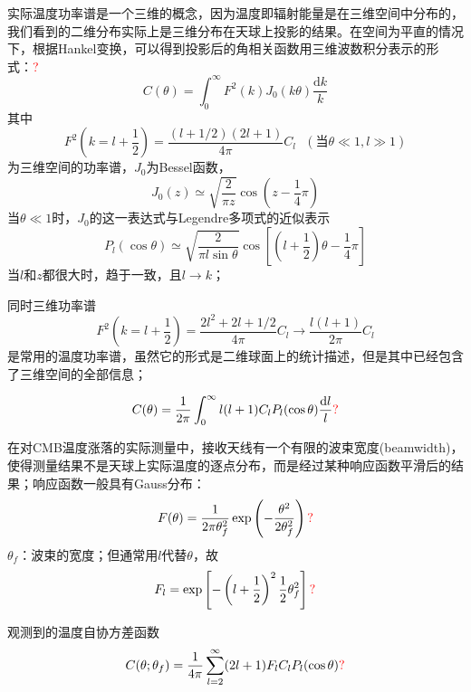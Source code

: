 \documentclass[12pt,a4paper]{article}
\newcommand{\dif}{\mathrm{d}}
\begin{document}
实际温度功率谱是一个三维的概念，因为温度即辐射能量是在三维空间中分布的，我们看到的二维分布实际上是三维分布在天球上投影的结果。在空间为平直的情况下，根据Hankel变换，可以得到投影后的角相关函数用三维波数积分表示的形式：\textcolor{red}{?}
\begin{equation}
C(\theta) = \int_0^{\infty} F^2(k) J_0(k\theta) \frac{\dif k}{k}
\end{equation}
其中
\begin{equation}
F^2(k = l+\frac{1}{2}) = \frac{(l+1/2)(2l+1)}{4\pi} C_l ~~~(\text{当}\theta \ll 1, l \gg 1)
\end{equation}
为三维空间的功率谱，$J_0$为Bessel函数，
\begin{equation}
J_0(z) \simeq \sqrt{\frac{2}{\pi z}} \cos(z-\frac{1}{4} \pi)
\end{equation}
当$\theta \ll 1$时，$J_0$的这一表达式与Legendre多项式的近似表示
\begin{equation}
P_l (\cos \theta) \simeq \sqrt{\frac{2}{\pi l \sin \theta}} \cos \left[(l+\frac{1}{2})\theta -\frac{1}{4} \pi \right]
\end{equation}
当$l$和$z$都很大时，趋于一致，且$l\rightarrow k$；

同时三维功率谱
\begin{equation}
F^2(k = l+\frac{1}{2}) = \frac{2l^2 +2l +1/2}{4\pi} C_l \rightarrow \frac{l(l+1)}{2\pi} C_l
\end{equation}
是常用的温度功率谱，虽然它的形式是二维球面上的统计描述，但是其中已经包含了三维空间的全部信息；

\begin{equation}
C(\theta) = \frac{1}{2\pi} \int_0^{\infty} l(l+1) C_l P_l (\cos \theta) \frac{\dif l}{l}\textcolor{red}{?}
\end{equation}

在对CMB温度涨落的实际测量中，接收天线有一个有限的波束宽度(beamwidth)，使得测量结果不是天球上实际温度的逐点分布，而是经过某种响应函数平滑后的结果；响应函数一般具有Gauss分布：
\begin{equation}
F(\theta) = \frac{1}{2\pi \theta_f^2} \exp \left(-\frac{\theta^2}{2\theta_f^2} \right)\textcolor{red}{?}
\end{equation}
$\theta_f$：波束的宽度；但通常用$l$代替$\theta$，故
\begin{equation}
F_l = \exp \left[ -\left(l+\frac{1}{2} \right)^2 \frac{1}{2} \theta_f^2 \right]\textcolor{red}{?}
\end{equation}


观测到的温度自协方差函数
\begin{equation}
C(\theta;\theta_f) = \frac{1}{4\pi} \sum_{l=2}^{\infty} (2l+1)F_l C_l P_l(\cos \theta)\textcolor{red}{?}
\end{equation}
\end{document}
